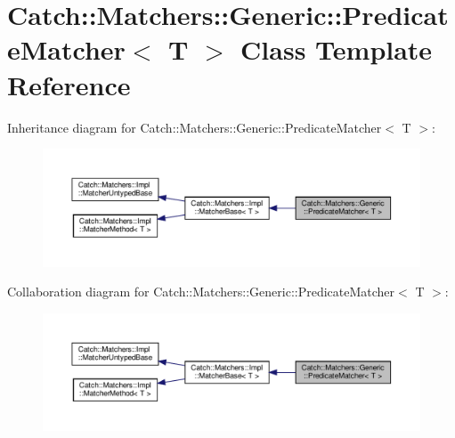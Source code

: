 \hypertarget{classCatch_1_1Matchers_1_1Generic_1_1PredicateMatcher}{}\section{Catch\+:\+:Matchers\+:\+:Generic\+:\+:Predicate\+Matcher$<$ T $>$ Class Template Reference}
\label{classCatch_1_1Matchers_1_1Generic_1_1PredicateMatcher}


Inheritance diagram for Catch\+:\+:Matchers\+:\+:Generic\+:\+:Predicate\+Matcher$<$ T $>$\+:
\nopagebreak
\begin{figure}[H]
\begin{center}
\leavevmode
\includegraphics[width=350pt]{classCatch_1_1Matchers_1_1Generic_1_1PredicateMatcher__inherit__graph}
\end{center}
\end{figure}


Collaboration diagram for Catch\+:\+:Matchers\+:\+:Generic\+:\+:Predicate\+Matcher$<$ T $>$\+:
\nopagebreak
\begin{figure}[H]
\begin{center}
\leavevmode
\includegraphics[width=350pt]{classCatch_1_1Matchers_1_1Generic_1_1PredicateMatcher__coll__graph}
\end{center}
\end{figure}
